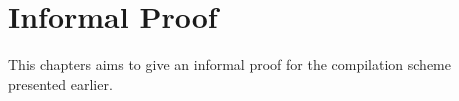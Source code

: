 \chapter{Informal Proof}
\label{chap:InformalProof}
This chapters aims to give an informal proof for the compilation scheme presented earlier.
